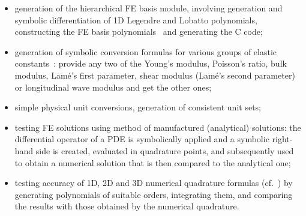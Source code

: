 \begin{itemize}
\item generation of the hierarchical FE basis module, involving generation and
  symbolic differentiation of 1D Legendre and Lobatto polynomials, constructing
  the FE basis polynomials~\cite{Solin2003hpfem} and generating the C code;
\item generation of symbolic conversion formulas for various groups of elastic
  constants~\cite{Fung1993contmech}:  provide any two of the Young's modulus,
  Poisson's ratio, bulk modulus, Lam\'{e}'s first parameter, shear modulus
  (Lam\'{e}'s second parameter) or longitudinal wave modulus and get the other
  ones;
\item simple physical unit conversions, generation of consistent unit sets;
\item testing FE solutions using method of manufactured (analytical)
  solutions:  the differential operator of a PDE is symbolically applied and a symbolic
  right-hand side is created, evaluated in quadrature points, and subsequently
  used to obtain a numerical solution that is then compared to the analytical
  one;
\item testing accuracy of 1D, 2D and 3D numerical quadrature formulas
  (cf.~\cite{Abramowitz1964handbook}) by generating polynomials of suitable
  orders, integrating them, and comparing the results with those obtained by
  the numerical quadrature.
\end{itemize}
